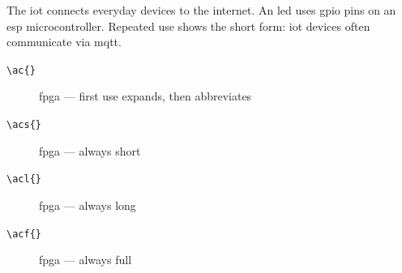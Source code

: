 The \ac{iot} connects everyday devices to the internet.
An \ac{led} uses \ac{gpio} pins on an \ac{esp} microcontroller.
Repeated use shows the short form: \ac{iot} devices often communicate via \ac{mqtt}.

\medskip

\begin{description}
    \item[\texttt{\textbackslash ac\{\}}]  \ac{fpga} --- first use expands, then abbreviates
    \item[\texttt{\textbackslash acs\{\}}] \acs{fpga} --- always short
    \item[\texttt{\textbackslash acl\{\}}] \acl{fpga} --- always long
    \item[\texttt{\textbackslash acf\{\}}] \acf{fpga} --- always full
\end{description}
